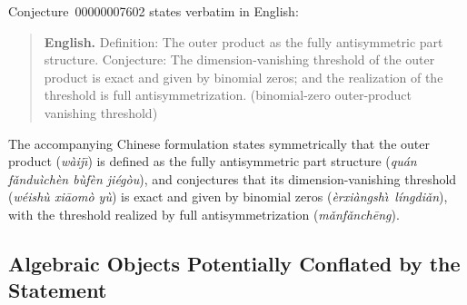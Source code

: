\documentclass[11pt,a4paper]{article}
\theoremstyle{definition}
\theoremstyle{remark}
\begin{document}
Conjecture~00000007602 states verbatim in English:
\begin{quote}
\textbf{English.} Definition: The outer product as the fully antisymmetric part structure. Conjecture: The dimension-vanishing threshold of the outer product is exact and given by binomial zeros; and the realization of the threshold is full antisymmetrization. (binomial-zero outer-product vanishing threshold)
\end{quote}
The accompanying Chinese formulation states symmetrically that the outer product (\emph{w\`aij\=\i}) is defined as the fully antisymmetric part structure (\emph{qu\'an f\v{a}ndu\`ich\`en b\`uf\`en ji\'eg\`ou}), and conjectures that its dimension-vanishing threshold (\emph{w\'eish\`u xi\=aom\`o y\`u}) is exact and given by binomial zeros (\emph{\`erxi\`angsh\`\i\ l\'ingdi\v{a}n}), with the threshold realized by full antisymmetrization (\emph{m\v{a}nf\v{a}nch\=eng}).

\subsection{Algebraic Objects Potentially Conflated by the Statement}
\end{document}

